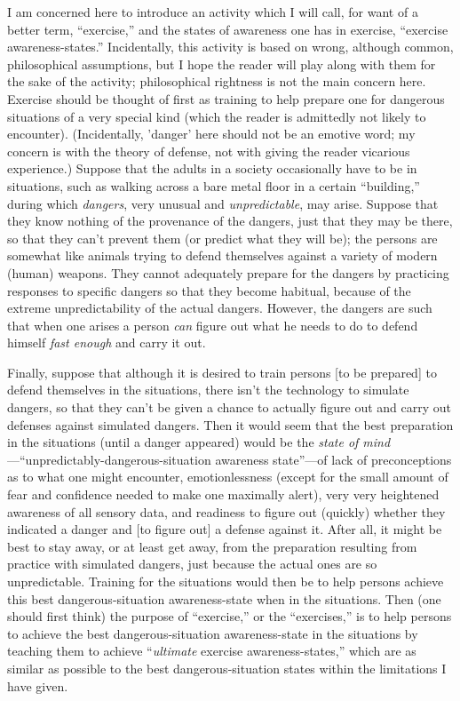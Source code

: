 I am concerned here to introduce an activity which I will call, for want of 
a better term, \enquote{exercise,} and the states of awareness one has in exercise, 
\enquote{exercise awareness-states.} Incidentally, this activity is based on wrong, 
although common, philosophical assumptions, but I hope the reader will play 
along with them for the sake of the activity; philosophical rightness is not 
the main concern here. Exercise should be thought of first as training to help 
prepare one for dangerous situations of a very special kind (which the 
reader is admittedly not likely to encounter). (Incidentally, 'danger' here 
should not be an emotive word; my concern is with the theory of defense, 
not with giving the reader vicarious experience.) Suppose that the adults in 
a society occasionally have to be in situations, such as walking across a 
bare metal floor in a certain \enquote{building,} during which \emph{dangers}, very unusual 
and \emph{unpredictable}, may arise. Suppose that they know nothing of the 
provenance of the dangers, just that they may be there, so that they can't 
prevent them (or predict what they will be); the persons are somewhat like 
animals trying to defend themselves against a variety of modern (human) 
weapons. They cannot adequately prepare for the dangers by practicing 
responses to specific dangers so that they become habitual, because of the 
extreme unpredictability of the actual dangers. However, the dangers are 
such that when one arises a person \emph{can} figure out what he needs to do to 
defend himself \emph{fast enough} and carry it out. 

Finally, suppose that although it is desired to train persons [to be prepared] 
to defend themselves in the situations, there isn't the technology to simulate 
dangers, so that they can't be given a chance to actually figure out and carry 
out defenses against simulated dangers. Then it would seem that the best 
preparation in the situations (until a danger appeared) would be the \emph{state 
of mind}---\enquote{unpredictably-dangerous-situation awareness state}---of lack of 
preconceptions as to what one might encounter, emotionlessness (except 
for the small amount of fear and confidence needed to make one maximally 
alert), very very heightened awareness of all sensory data, and readiness 
to figure out (quickly) whether they indicated a danger and [to figure out] a 
defense against it. After all, it might be best to stay away, or at least get 
away, from the preparation resulting from practice with simulated dangers, 
just because the actual ones are so unpredictable. Training for the situations 
would then be to help persons achieve this best dangerous-situation 
awareness-state when in the situations. Then (one should first think) the purpose 
of \enquote{exercise,} or the \enquote{exercises,} is to help persons to achieve the best 
dangerous-situation awareness-state in the situations by teaching them to 
achieve \enquote{\emph{ultimate} exercise awareness-states,} which are as similar as 
possible to the best dangerous-situation states within the limitations I have 
given. 

